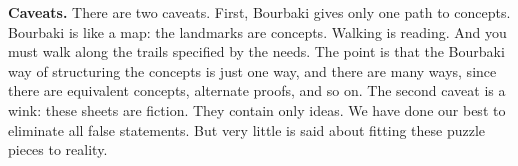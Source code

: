 \textbf{Caveats.}
There are two caveats.
First, Bourbaki gives
only one path to concepts.
Bourbaki is like a map:
the landmarks are concepts.
Walking is reading.
And you must walk along the
trails specified by the needs.
The point is that the Bourbaki way
of structuring the concepts is just
one way, and there are many ways, since
there are equivalent concepts,
alternate proofs, and so on.
The second caveat is a wink:
these sheets are fiction.
They contain only ideas.
We have done our
best to eliminate all false statements.
But very little is said about
fitting these puzzle pieces to
reality.


